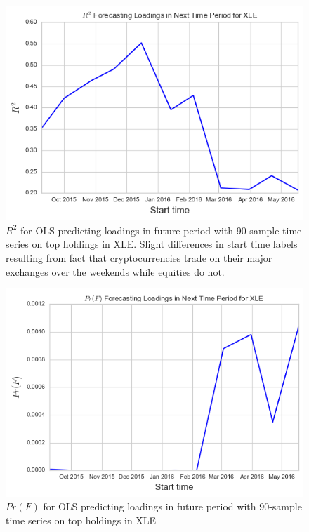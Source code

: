 \documentclass[12pt,twoside]{article}
\begin{document}
\bigbreak
\begin{figure}[H]
	\centering
	\includegraphics[scale=.7]{xle_R2_90D.png}
	\caption{$R^2$ for OLS predicting loadings in future period with 90-sample time series on top holdings in XLE. Slight differences in start time labels resulting from fact that cryptocurrencies trade on their major exchanges over the weekends while equities do not.}
	\label{fig:xle_R2}
\end{figure}
\bigbreak

\bigbreak
\begin{figure}[H]
	\centering
	\includegraphics[scale=.7]{xle_F_90D.png}
	\caption{$Pr(F)$ for OLS predicting loadings in future period with 90-sample time series on top holdings in XLE}
	\label{fig:xle_F}
\end{figure}
\bigbreak
\end{document}
